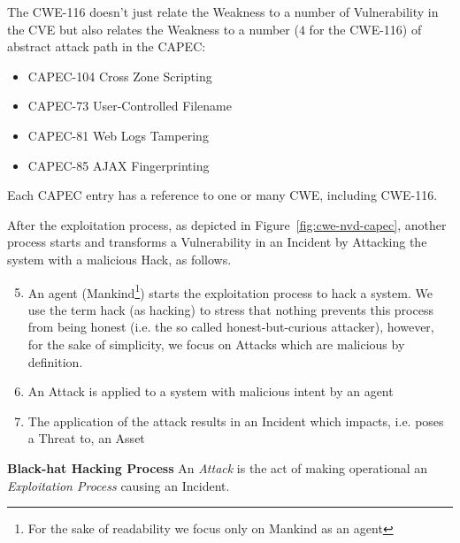 \begin{example}
The CWE-116 doesn't just relate the Weakness to a number of Vulnerability in
	the CVE but also relates the Weakness to a number ($4$ for the CWE-116)
	of abstract attack path in the CAPEC:
	\begin{itemize}
		\item CAPEC-104\autocite{CAPEC-104} Cross Zone Scripting
		\item CAPEC-73\autocite{CAPEC-73} User-Controlled Filename
		\item CAPEC-81\autocite{CAPEC-81} Web Logs Tampering
		\item CAPEC-85\autocite{CAPEC-85} AJAX Fingerprinting
	\end{itemize}

	Each CAPEC entry has a reference to one or many CWE, including CWE-116.
\end{example}

After the exploitation process, as depicted in Figure~\ref{fig:cwe-nvd-capec},
another process starts and transforms a Vulnerability in an Incident by
Attacking the system with a malicious Hack, as follows.
\begin{enumerate}
\setcounter{enumi}{4}
	\item An agent (Mankind\footnote{For the sake of readability we focus
		only on Mankind as an agent}) starts the exploitation process
		to hack a system. We use the term hack (as hacking) to stress
		that nothing prevents this process from being honest (i.e. the
		so called honest-but-curious attacker), however, for the sake
		of simplicity, we focus on Attacks which are malicious by
		definition.
	\item An Attack is applied to a system with malicious intent by an
		agent
	\item The application of the attack results in an Incident which
		impacts, i.e. poses a Threat to, an Asset
\end{enumerate}

\begin{definition}{\bf Black-hat Hacking Process}\label{def:hackingprocess}
An \emph{Attack} is the act of making operational an \emph{Exploitation Process} 
	causing an Incident. 
\end{definition}

